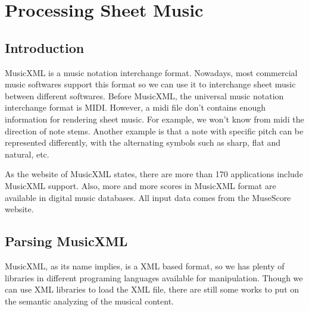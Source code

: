 \chapter{Processing Sheet Music}

\label{Chapter:Processing-Sheet-Music}

\newcommand{\element}[1]{{\textit #1}}

\section{Introduction}
MusicXML\citep{MusicXML} is a music notation interchange format. Nowadays, most commercial music softwares support this format so we can use it to interchange sheet music between different softwares. Before MusicXML, the universal music notation interchange format is MIDI. However, a midi file don't contains enough information for rendering sheet music. For example, we won't know from midi the direction of note stems. Another example is that a note with specific pitch can be represented differently, with the alternating symbols such as sharp, flat and natural, etc.

As the website of MusicXML states, there are more than 170 applications include MusicXML support. Also, more and more scores in MusicXML format are available in digital music databases. All input data comes from the MuseScore website. 

\section{Parsing MusicXML}
MusicXML, as its name implies, is a XML based format, so we has plenty of libraries in different programing languages available for manipulation.
Though we can use XML libraries to load the XML file, there are still some works to put on the semantic analyzing of the musical content. 
